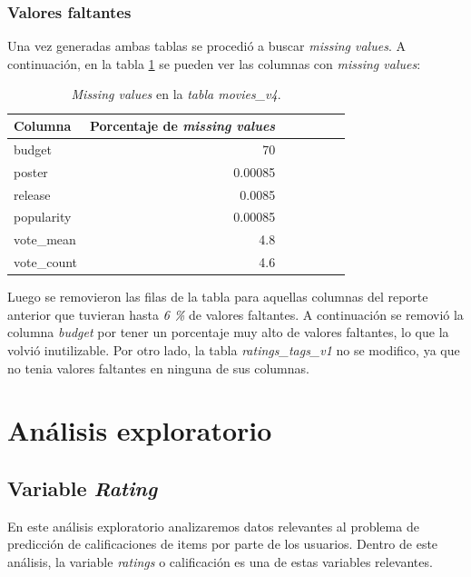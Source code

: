 \documentclass[11pt,a4paper,twoside]{thesis}
\begin{document}
\subsubsection*{Valores faltantes}

Una vez generadas ambas tablas se procedió a buscar \textit{missing values}. A
continuación, en la tabla \ref{table:tab} se pueden ver las columnas con
\textit{missing values}:

\begin{table}[h!]
	\centering
	\footnotesize
	\begin{tabular}{lrrrrrr}
		\hline
		Columna     & Porcentaje de \textit{missing values} \\
		\hline
		budget      & 70                                    \\
		poster      & 0.00085                               \\
		release     & 0.0085                                \\
		popularity  & 0.00085                               \\
		vote\_mean  & 4.8                                   \\
		vote\_count & 4.6                                   \\
		\hline
	\end{tabular}
	\caption{\textit{Missing values} en la \textit{tabla movies\_v4}.}
	\label{table:tab}
\end{table}

Luego se removieron las filas de la tabla para aquellas columnas del reporte
anterior que tuvieran hasta \textit{6 \%} de valores faltantes. A continuación
se removió la columna \textit{budget} por tener un porcentaje muy alto de
valores faltantes, lo que la volvió inutilizable. Por otro lado, la tabla
\textit{ratings\_tags\_v1} no se modifico, ya que no tenia valores faltantes en
ninguna de sus columnas.

\clearpage

\section{Análisis exploratorio}

\subsection{Variable \textit{Rating}}

En este análisis exploratorio analizaremos datos relevantes al problema de
predicción de calificaciones de items por parte de los usuarios. Dentro de este
análisis, la variable \textit{ratings} o calificación es una de estas variables
relevantes.
\end{document}
